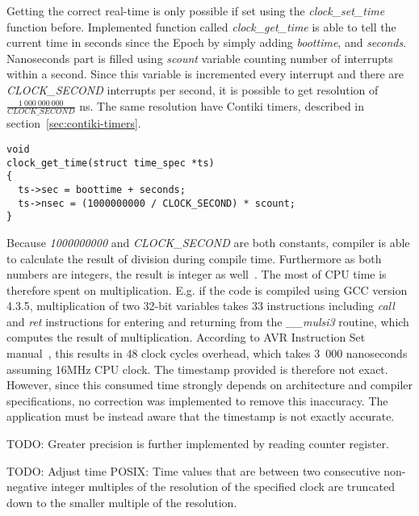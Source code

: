 Getting the correct real-time is only possible if set using
the {\it{clock\_set\_time}} function before.
Implemented function called {\it{clock\_get\_time}} is able to tell the
current time in seconds since the Epoch by simply adding {\it{boottime}},
and {\it{seconds}}.
Nanoseconds part is filled using {\it{scount}} variable counting number of
interrupts within a second.
Since this variable is incremented every interrupt and there are {\it{CLOCK\_SECOND}} interrupts
per second, it is possible to get resolution of $\frac{1~000~000~000}{CLOCK\_SECOND}$ ns.
The same resolution have Contiki timers, described in section~\ref{sec:contiki-timers}.
\begin{lstlisting}
void
clock_get_time(struct time_spec *ts)
{
  ts->sec = boottime + seconds;
  ts->nsec = (1000000000 / CLOCK_SECOND) * scount;
}
\end{lstlisting}
Because {\it{1000000000}} and {\it{CLOCK\_SECOND}} are both constants, compiler is able to
calculate the result of division during compile time.
Furthermore as both numbers are integers, the result is integer as well~\cite{c99}.
The most of CPU time is therefore spent on multiplication.
E.g. if the code is compiled using GCC version 4.3.5,
multiplication of two 32-bit variables takes 33 instructions including {\it{call}} and {\it{ret}}
instructions for entering and returning from the {\it{\_\_mulsi3}} routine, which computes
the result of multiplication.
According to AVR Instruction Set manual~\cite{avr-instruction-set},
this results in 48 clock cycles overhead,
which takes 3~000 nanoseconds assuming 16MHz CPU clock.
The timestamp provided is therefore not exact.
However, since this consumed time strongly depends on architecture and compiler specifications,
no correction was implemented to remove this inaccuracy.
The application must be instead aware that the timestamp is not exactly accurate.

TODO: Greater precision is further implemented by reading counter register.

TODO: Adjust time
POSIX:
Time values that are between two consecutive non-negative integer multiples
of the resolution of the specified clock are truncated down to the smaller multiple of the resolution.
